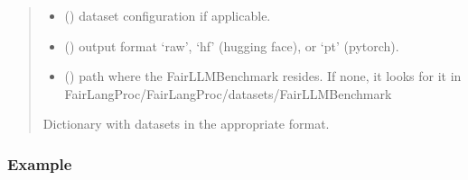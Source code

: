 \documentclass[letterpaper,10pt,english]{sphinxmanual}
\begin{document}
\begin{fulllineitems}
\begin{quote}
\begin{description}
\begin{itemize}
\item {} 
\sphinxAtStartPar
{} () \textendash{} dataset configuration if applicable.

\item {} 
\sphinxAtStartPar
{} () \textendash{} output format \sphinxhyphen{} ‘raw’, ‘hf’ (hugging face), or ‘pt’ (pytorch).

\item {} 
\sphinxAtStartPar
{} () \textendash{} path where the Fair\sphinxhyphen{}LLM\sphinxhyphen{}Benchmark resides. If none, it looks for it
in FairLangProc/FairLangProc/datasets/Fair\sphinxhyphen{}LLM\sphinxhyphen{}Benchmark

\end{itemize}

\sphinxAtStartPar
{} \textendash{} Dictionary with datasets in the appropriate format.

\sphinxAtStartPar
{}

\end{description}\end{quote}
\subsubsection*{Example}


\end{fulllineitems}
\end{document}
